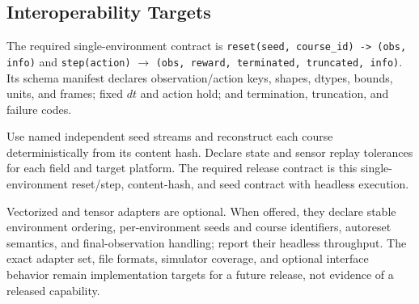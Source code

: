 \subsection{Interoperability Targets}

The required single-environment contract is
\texttt{reset(seed, course\_id) -> (obs, info)} and
\texttt{step(action)} $\to$ \texttt{(obs, reward, terminated,}\
\texttt{truncated, info)}. Its schema
manifest declares observation/action keys, shapes, dtypes, bounds, units, and frames;
fixed $dt$ and action hold; and termination, truncation, and failure codes.

Use named independent seed streams and reconstruct each course deterministically from
its content hash. Declare state and sensor replay tolerances for each field and target
platform. The required release contract is this single-environment reset/step,
content-hash, and seed contract with headless execution.

Vectorized and tensor adapters are optional. When offered, they declare stable
environment ordering, per-environment seeds and course identifiers, autoreset
semantics, and final-observation handling; report their headless throughput. The exact
adapter set, file formats, simulator coverage, and optional interface behavior remain
implementation targets for a future release, not evidence of a released capability.
